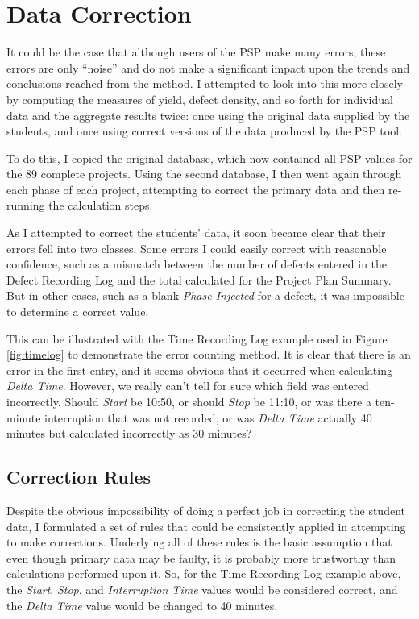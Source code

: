 \section{Data Correction}
It could be the case that although users of the PSP make many errors, these
errors are only ``noise'' and do not make a significant impact upon the
trends and conclusions reached from the method.  I attempted to look into
this more closely by computing the measures of yield, defect density, and
so forth for individual data and the aggregate results twice: once using
the original data supplied by the students, and once using correct versions
of the data produced by the PSP tool.

To do this, I copied the original database, which now contained all PSP
values for the 89 complete projects.  Using the second database, I then
went again through each phase of each project, attempting to correct the
primary data and then re-running the calculation steps.

As I attempted to correct the students' data, it soon became clear that
their errors fell into two classes.  Some errors I could easily correct
with reasonable confidence, such as a mismatch between the number of
defects entered in the Defect Recording Log and the total calculated for
the Project Plan Summary.  But in other cases, such as a blank {\it Phase
  Injected} for a defect, it was impossible to determine a correct value.

This can be illustrated with the Time Recording Log example used in Figure
\ref{fig:timelog} to demonstrate the error counting method.  It is clear
that there is an error in the first entry, and it seems obvious that it
occurred when calculating {\it Delta Time}.  However, we really can't tell
for sure which field was entered incorrectly.  Should {\it Start} be 10:50,
or should {\it Stop} be 11:10, or was there a ten-minute interruption that
was not recorded, or was {\it Delta Time} actually 40 minutes but
calculated incorrectly as 30 minutes?

\subsection{Correction Rules}
Despite the obvious impossibility of doing a perfect job in correcting the
student data, I formulated a set of rules that could be consistently
applied in attempting to make corrections.  Underlying all of these rules
is the basic assumption that even though primary data may be faulty, it is
probably more trustworthy than calculations performed upon it.  So, for the
Time Recording Log example above, the {\it Start}, {\it Stop}, and {\it
  Interruption Time} values would be considered correct, and the {\it Delta
  Time} value would be changed to 40 minutes.


